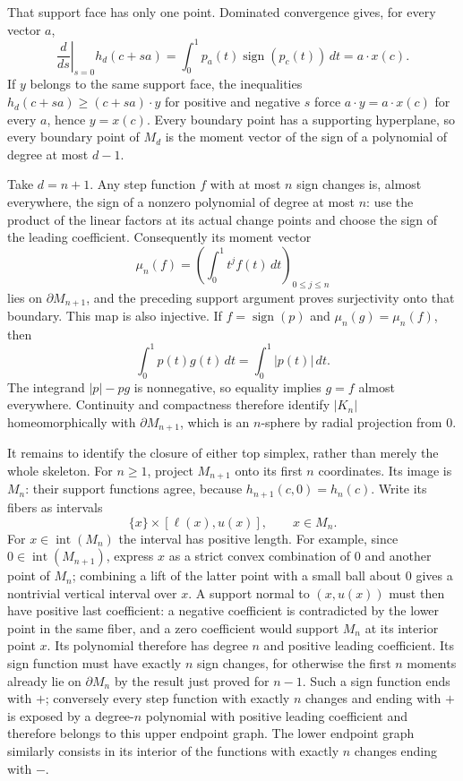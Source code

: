 That support face has only one point.  Dominated convergence gives,
for every vector $a$,
\[
 \left.\frac{d}{ds}\right|_{s=0}h_d(c+sa)
   =\int_0^1p_a(t)\operatorname{sign}(p_c(t))\,dt
   =a\cdot x(c).
\]
If $y$ belongs to the same support face, the inequalities
$h_d(c+sa)\geq(c+sa)\cdot y$ for positive and negative $s$
force $a\cdot y=a\cdot x(c)$ for every $a$, hence $y=x(c)$.
Every boundary point has a supporting hyperplane, so every boundary
point of $M_d$ is the moment vector of the sign of a polynomial of
degree at most $d-1$.

Take $d=n+1$.  Any step function $f$ with at most $n$ sign changes
is, almost everywhere, the sign of a nonzero polynomial of degree
at most $n$: use the product of the linear factors at its actual
change points and choose the sign of the leading coefficient.
Consequently its moment vector
\[
 \mu_n(f)=\left(\int_0^1t^j f(t)\,dt\right)_{0\leq j\leq n}
\]
lies on $\partial M_{n+1}$, and the preceding support argument proves
surjectivity onto that boundary.  This map is also injective.
If $f=\operatorname{sign}(p)$ and $\mu_n(g)=\mu_n(f)$, then
\[
 \int_0^1p(t)g(t)\,dt=\int_0^1|p(t)|\,dt.
\]
The integrand $|p|-pg$ is nonnegative, so equality implies $g=f$
almost everywhere.  Continuity and compactness therefore identify
$|K_n|$ homeomorphically with $\partial M_{n+1}$, which is an
$n$-sphere by radial projection from $0$.

It remains to identify the closure of either top simplex, rather
than merely the whole skeleton.  For $n\geq1$, project $M_{n+1}$
onto its first $n$ coordinates.  Its image is $M_n$: their support
functions agree, because $h_{n+1}(c,0)=h_n(c)$.  Write its fibers
as intervals
\[
 \{x\}\times[\ell(x),u(x)],\qquad x\in M_n.
\]
For $x\in\operatorname{int}(M_n)$ the interval has positive length.
For example, since $0\in\operatorname{int}(M_{n+1})$, express $x$
as a strict convex combination of $0$ and another point of $M_n$;
combining a lift of the latter point with a small ball about $0$
gives a nontrivial vertical interval over $x$.  A support normal
to $(x,u(x))$ must then have positive last coefficient: a negative
coefficient is contradicted by the lower point in the same fiber,
and a zero coefficient would support $M_n$ at its interior point
$x$.  Its polynomial therefore has degree $n$ and positive leading
coefficient.  Its sign function must have exactly $n$ sign changes,
for otherwise the first $n$ moments already lie on $\partial M_n$
by the result just proved for $n-1$.  Such a sign function ends
with $+$; conversely every step function with exactly $n$ changes
and ending with $+$ is exposed by a degree-$n$ polynomial with
positive leading coefficient and therefore belongs to this upper
endpoint graph.  The lower endpoint graph similarly consists in
its interior of the functions with exactly $n$ changes ending
with $-$.

